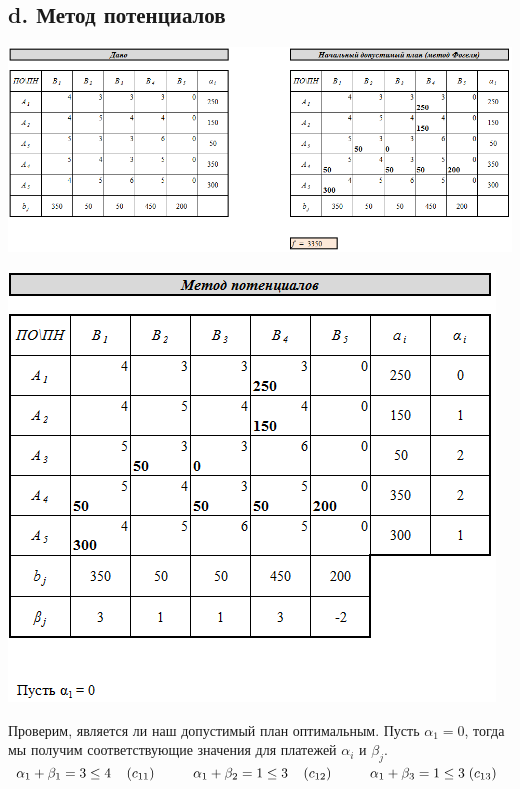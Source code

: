 \documentclass[14pt,a4paper,fleqn]{extarticle}
\begin{document}
\subsection*{d. Метод потенциалов}
\begin{center}
	\includegraphics[scale=0.5]{34}
\end{center}
\begin{center}
	\includegraphics[scale=0.5]{35}
\end{center}
Проверим, является ли наш допустимый план оптимальным. Пусть $\alpha_1 = 0$, тогда мы получим соответствующие значения для платежей $\alpha_i$ и $\beta_j$.\\
$\alpha_1 + \beta_1 = 3 \leq 4 \hspace*{0.4cm} (c_{11}) \hspace*{1cm} \alpha_1 + \beta_2 = 1 \leq 3 \hspace*{0.4cm} (c_{12}) \hspace*{1cm} \alpha_1 + \beta_3 = 1 \leq 3 \hspace*{0.1cm} (c_{13})$\\
\end{document}
